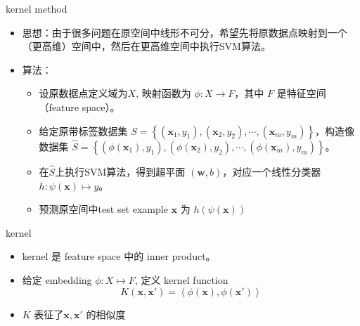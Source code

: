 \begin{frame}[fragile]{kernel method}
    \begin{itemize}
        \item 思想：由于很多问题在原空间中线形不可分，希望先将原数据点映射到一个（更高维）空间中，然后在更高维空间中执行SVM算法。
        \item 算法：
        \begin{itemize}
            \item 设原数据点定义域为$X$, 映射函数为 $\phi: X \to F$，其中 $F$ 是特征空间（feature space）。
            \item 给定原带标签数据集 $S=\left\{ (\mathbf x_1, y_1), (\mathbf x_2, y_2), \cdots, (\mathbf x_m, y_m) \right\} $，构造像数据集 $\hat S = \left\{ (\phi(\mathbf x_1), y_1), (\phi(\mathbf x_2), y_2), \cdots, (\phi(\mathbf x_m), y_m) \right\} $。
            \item 在$\hat S$上执行SVM算法，得到超平面 $(\mathbf w, b)$，对应一个线性分类器$h: \psi(\mathbf{x}) \mapsto y$。
            \item 预测原空间中test set example $\mathbf{x}$ 为 $h(\psi(\mathbf{x}))$
        \end{itemize}
    \end{itemize}
\end{frame}

\begin{frame}[fragile]{kernel}
    \begin{itemize}
        \item kernel 是 feature space 中的 inner product。
        \item 给定 embedding $\phi: X \mapsto F$, 定义 kernel function 
        \[
            K(\mathbf{x}, \mathbf{x'}) = \left\langle \phi(\mathbf{x}), \phi(\mathbf{x'}) \right\rangle
        \]
        \item $K$ 表征了$\mathbf{x}, \mathbf{x'}$ 的相似度
    \end{itemize}
\end{frame}

